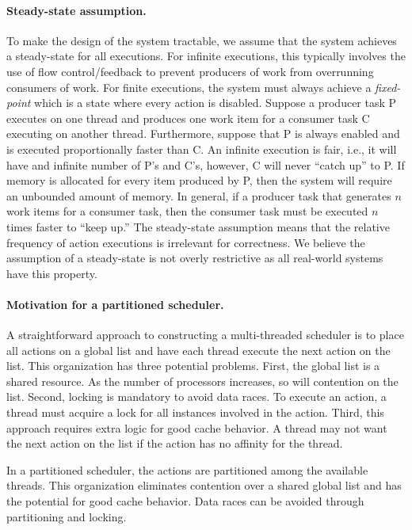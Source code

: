 \paragraph{Steady-state assumption.}
To make the design of the system tractable, we assume that the system achieves a steady-state for all executions.
For infinite executions, this typically involves the use of flow control/feedback to prevent producers of work from overrunning consumers of work.
For finite executions, the system must always achieve a \emph{fixed-point} which is a state where every action is disabled.
Suppose a producer task P executes on one thread and produces one work item for a consumer task C executing on another thread.
Furthermore, suppose that P is always enabled and is executed proportionally faster than C.
An infinite execution is fair, i.e., it will have and infinite number of P's and C's, however, C will never ``catch up'' to P.
If memory is allocated for every item produced by P, then the system will require an unbounded amount of memory.
In general, if a producer task that generates $n$ work items for a consumer task, then the consumer task must be executed $n$ times faster to ``keep up.''
The steady-state assumption means that the relative frequency of action executions is irrelevant for correctness.
We believe the assumption of a steady-state is not overly restrictive as all real-world systems have this property.

\paragraph{Motivation for a partitioned scheduler.}
A straightforward approach to constructing a multi-threaded scheduler is to place all actions on a global list and have each thread execute the next action on the list.
This organization has three potential problems.
First, the global list is a shared resource.
As the number of processors increases, so will contention on the list.
Second, locking is mandatory to avoid data races.
To execute an action, a thread must acquire a lock for all instances involved in the action.
Third, this approach requires extra logic for good cache behavior.
A thread may not want the next action on the list if the action has no affinity for the thread.

In a partitioned scheduler, the actions are partitioned among the available threads.
This organization eliminates contention over a shared global list and has the potential for good cache behavior.
Data races can be avoided through partitioning and locking.
